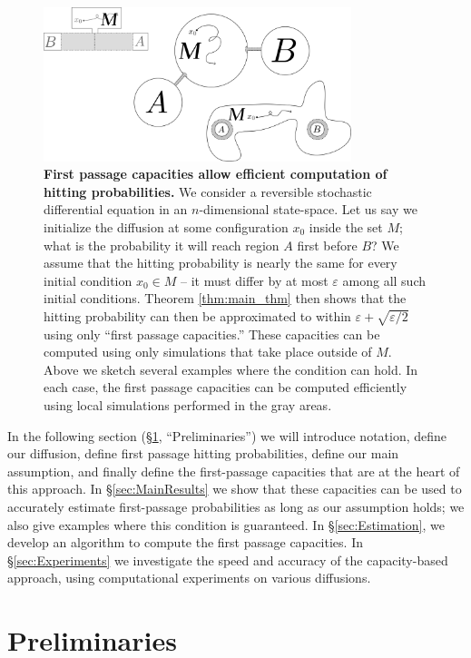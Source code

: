 \documentclass[12pt, nofootinbib,english, amsmath, amssymb, aps, priprint, graphicx,floatfix]{revtex4-1}
\theoremstyle{plain}
\theoremstyle{definition}
\theoremstyle{plain}
\begin{document}
\begin{figure}
    \centering  \includegraphics[width=0.8\textwidth]{bigpicture.png}
    \caption{\footnotesize\linespread{1.}\selectfont{} {\bf First passage capacities allow efficient computation of hitting probabilities.} We consider a reversible stochastic differential equation in an $n$-dimensional state-space.  Let us say we initialize the diffusion at some configuration $x_0$ inside the set $M$; what is the probability it will reach region $A$ first before $B$?  We assume that the hitting probability is nearly the same for every initial condition $x_0 \in M$ -- it must differ by at most $\varepsilon$ among all such initial conditions.  Theorem \ref{thm:main_thm} then shows that the hitting probability can then be approximated to within $\varepsilon + \sqrt{\varepsilon/2}$ using only ``first passage capacities.'' These capacities can be computed using only simulations that take place outside of $M$.  Above we sketch several examples where the condition can hold.  In each case, the first passage capacities can be computed efficiently using local simulations performed in the gray areas.}
\label{fig:ToyModel}
\end{figure}

In the following section (\S\ref{sec:Preliminaries}, ``Preliminaries'') we will introduce notation, define our diffusion, define first passage hitting probabilities, define our main assumption, and finally define the first-passage capacities that are at the heart of this approach.  In \S\ref{sec:MainResults} we show that these capacities can be used to accurately estimate first-passage probabilities as long as our assumption holds; we also give examples where this condition is guaranteed.  In \S\ref{sec:Estimation}, we develop an algorithm to compute the first passage capacities.   In \S\ref{sec:Experiments} we investigate the speed and accuracy of the capacity-based approach, using computational experiments on various diffusions.

\section{Preliminaries}
\label{sec:Preliminaries}
\end{document}
